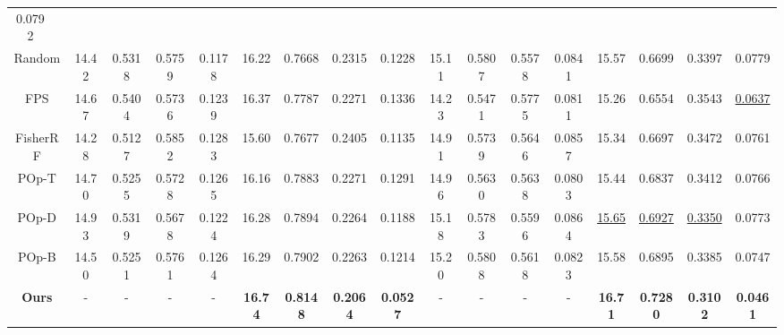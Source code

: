 \begin{table}[ht]
{{\begin{tabular}{cc|cccccccc|cccccccc}
  0.0792 \\
\multicolumn{2}{c|}{Random} &
  14.42 &
  0.5318 &
  0.5759 &
  \multicolumn{1}{c|}{0.1178} &
  16.22 &
  0.7668 &
  0.2315 &
  \multicolumn{1}{c|}{0.1228} &
  15.11 &
  0.5807 &
  0.5578 &
  \multicolumn{1}{c|}{0.0841} &
  15.57 &
  0.6699 &
  0.3397 &
  0.0779 \\
\multicolumn{2}{c|}{FPS} &
  14.67 &
  0.5404 &
  0.5736 &
  \multicolumn{1}{c|}{0.1239} &
  16.37 &
  0.7787 &
  0.2271 &
  \multicolumn{1}{c|}{0.1336} &
  14.23 &
  0.5471 &
  0.5775 &
  \multicolumn{1}{c|}{0.0811} &
  15.26 &
  0.6554 &
  0.3543 &
  \underline{0.0637} \\ 
  \midrule
\multicolumn{2}{c|}{FisherRF \cite{jiang2024fisherrf}} &
  14.28 &
  0.5127 &
  0.5852 &
  \multicolumn{1}{c|}{0.1283} &
  15.60 &
  0.7677 &
  0.2405 &
  \multicolumn{1}{c|}{0.1135} &
  14.91 &
  0.5739 &
  0.5646 &
  \multicolumn{1}{c|}{0.0857} &
  15.34 &
  0.6697 &
  0.3472 &
  0.0761 \\
\multicolumn{2}{c|}{POp-T \cite{wilson2025pop}} &
  14.70 &
  0.5255 &
  0.5728 &
  \multicolumn{1}{c|}{0.1265} &
  16.16 &
  0.7883 &
  0.2271 &
  \multicolumn{1}{c|}{0.1291} &
  14.96 &
  0.5630 &
  0.5638 &
  \multicolumn{1}{c|}{0.0803} &
  15.44 &
  0.6837 &
  0.3412 &
  0.0766 \\
\multicolumn{2}{c|}{POp-D \cite{wilson2025pop}} &
  14.93 &
  0.5319 &
  0.5678 &
  \multicolumn{1}{c|}{0.1224} &
  16.28 &
  0.7894 &
  0.2264 &
  \multicolumn{1}{c|}{0.1188} &
  15.18 &
  0.5783 &
  0.5596 &
  \multicolumn{1}{c|}{0.0864} &
  \underline{15.65} &
  \underline{0.6927} &
  \underline{0.3350} &
  0.0773 \\
\multicolumn{2}{c|}{POp-B \cite{wilson2025pop}} &
  14.50 &
  0.5251 &
  0.5761 &
  \multicolumn{1}{c|}{0.1264} &
  16.29 &
  0.7902 &
  0.2263 &
  \multicolumn{1}{c|}{0.1214} &
  15.20 &
  0.5808 &
  0.5618 &
  \multicolumn{1}{c|}{0.0823} &
  15.58 &
  0.6895 &
  0.3385 &
  0.0747 \\
\multicolumn{2}{c|}{\textbf{Ours}} &
  - &
  - &
  - &
  \multicolumn{1}{c|}{-} &
  \textbf{16.74} &
  \textbf{0.8148} &
  \textbf{0.2064} &
  \multicolumn{1}{c|}{\textbf{0.0527}} &
  - &
  - &
  - &
  \multicolumn{1}{c|}{-} &
  \textbf{16.71} &
  \textbf{0.7280} &
  \textbf{0.3102} &
  \textbf{0.0461} \\ 
  \bottomrule
\end{tabular}
}
}
\vspace{-4mm}
\end{table}